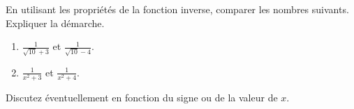 
\begin{exercice}\label{exosmath-0277}

    En utilisant les propriétés de la fonction inverse, comparer les nombres suivants. Expliquer la démarche.
    \begin{enumerate}
        \item
            \( \frac{1}{ \sqrt{10}+3 }\) et \( \frac{1}{ \sqrt{10}-4 }\).
        \item
            \( \frac{1}{ x^2+3 }\) et \( \frac{1}{ x^2+4 }\).
    \end{enumerate}
    Discutez éventuellement en fonction du signe ou de la valeur de \( x\).

\end{exercice}
